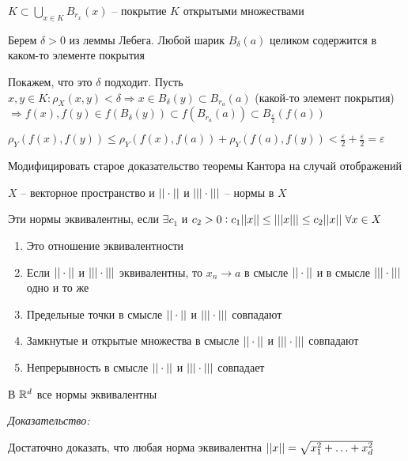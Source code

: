 \documentclass[12pt]{article}
\begin{document}
$K \subset \bigcup\limits_{x \in K} B_{r_x}(x)$ -- покрытие $K$ открытыми множествами

Берем $\delta > 0$ из леммы Лебега. Любой шарик $B_{\delta}(a)$ целиком содержится в каком-то элементе покрытия

Покажем, что это $\delta$ подходит. Пусть $x, y \in K : \rho_X(x, y) < \delta \Rightarrow x \in B_\delta(y) \subset B_{r_a}(a)$ (какой-то элемент покрытия) $\Rightarrow f(x), f(y) \in f(B_\delta(y)) \subset f(B_{r_a}(a)) \subset B_{\frac{\varepsilon}{2}}(f(a))$

$\rho_Y(f(x), f(y)) \leq \rho_Y(f(x), f(a)) + \rho_Y(f(a), f(y)) < \frac{\varepsilon}{2} + \frac{\varepsilon}{2} = \varepsilon$

\begin{Exercise}{}
    Модифицировать старое доказательство теоремы Кантора на случай отображений
\end{Exercise}

\begin{defin}{}
    $X$ -- векторное пространство и $|| \cdot ||$ и $||| \cdot |||$ -- нормы в $X$

    Эти нормы эквивалентны, если $\exists c_1$ и $c_2 > 0 : c_1 || x || \leq ||| x ||| \leq c_2 || x ||\ \forall x \in X$
\end{defin}

\begin{Remark}{}
    \begin{enumerate}
        \item Это отношение эквивалентности
        \item Если $|| \cdot ||$ и $||| \cdot |||$ эквивалентны, то $x_n \to a$ в смысле $|| \cdot ||$ и в смысле $||| \cdot |||$ одно и то же
        \item Предельные точки в смысле $|| \cdot ||$ и $||| \cdot |||$ совпадают
        \item Замкнутые и открытые множества в смысле $|| \cdot ||$ и $||| \cdot |||$ совпадают
        \item Непрерывность в смысле $|| \cdot ||$ и $||| \cdot |||$ совпадает
    \end{enumerate}
\end{Remark}

\begin{theo}{}
    В $\mathbb R^d$ все нормы эквивалентны
\end{theo}

\textit{Доказательство:}

Достаточно доказать, что любая норма эквивалентна $|| x || = \sqrt{x_1^2 + \ldots + x_d^2}$
\end{document}

